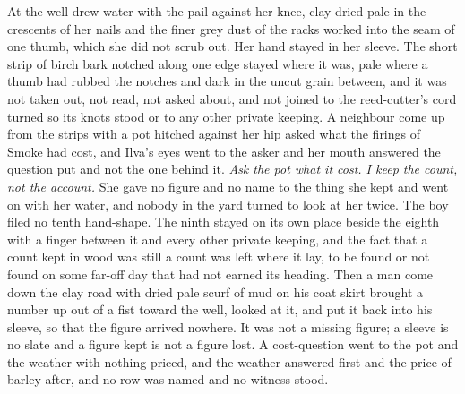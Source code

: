 At the well \person[Ilva] drew water with the pail against her knee, clay dried pale in the crescents of her nails and the finer grey dust of the racks worked into the seam of one thumb, which she did not scrub out. Her hand stayed in her sleeve. The short strip of birch bark notched along one edge stayed where it was, pale where a thumb had rubbed the notches and dark in the uncut grain between, and it was not taken out, not read, not asked about, and not joined to the reed-cutter's cord turned so its knots stood or to any other private keeping. A neighbour come up from the strips with a pot hitched against her hip asked what the firings of Smoke had cost, and Ilva's eyes went to the asker and her mouth answered the question put and not the one behind it. \emph{Ask the pot what it cost. I keep the count, not the account.} She gave no figure and no name to the thing she kept and went on with her water, and nobody in the yard turned to look at her twice. The boy filed no tenth hand-shape. The ninth stayed on its own place beside the eighth with a finger between it and every other private keeping, and the fact that a count kept in wood was still a count was left where it lay, to be found or not found on some far-off day that had not earned its heading. Then a man come down the clay road with dried pale scurf of mud on his coat skirt brought a number up out of a fist toward the well, looked at it, and put it back into his sleeve, so that the figure arrived nowhere. It was not a missing figure; a sleeve is no slate and a figure kept is not a figure lost. A cost-question went to the pot and the weather with nothing priced, and the weather answered first and the price of barley after, and no row was named and no witness stood.

\scenebreak

